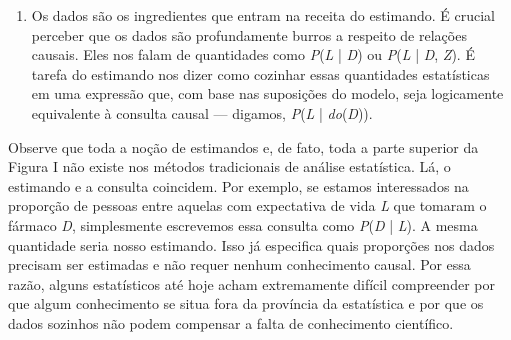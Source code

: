 \documentclass[11pt,a5paper,twoside]{book}
\begin{document}
\begin{enumerate}
\item Os dados são os ingredientes que entram na receita do estimando. É crucial perceber que os dados são profundamente burros a respeito de relações causais. Eles nos falam de quantidades como \textit{P}(\textit{L} | \textit{D}) ou \textit{P}(\textit{L} | \textit{D}, \textit{Z}). É tarefa do estimando nos dizer como cozinhar essas quantidades estatísticas em uma expressão que, com base nas suposições do modelo, seja logicamente equivalente à consulta causal — digamos, \textit{P}(\textit{L} | \textit{do}(\textit{D})).
\end{enumerate}
Observe que toda a noção de estimandos e, de fato, toda a parte superior da Figura I não existe nos métodos tradicionais de análise estatística. Lá, o estimando e a consulta coincidem. Por exemplo, se estamos interessados na proporção de pessoas entre aquelas com expectativa de vida \textit{L} que tomaram o fármaco \textit{D}, simplesmente escrevemos essa consulta como \textit{P}(\textit{D} | \textit{L}). A mesma quantidade seria nosso estimando. Isso já especifica quais proporções nos dados precisam ser estimadas e não requer nenhum conhecimento causal. Por essa razão, alguns estatísticos até hoje acham extremamente difícil compreender por que algum conhecimento se situa fora da província da estatística e por que os dados sozinhos não podem compensar a falta de conhecimento científico.
\end{document}

